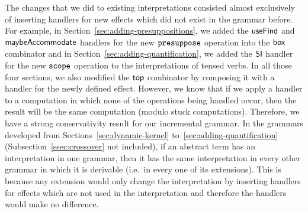 The changes that we did to existing interpretations consisted almost
exclusively of inserting handlers for new effects which did not exist in
the grammar before. For example, in
Section~\ref{sec:adding-presuppositions}, we added the $\textsf{useFind}$ and
$\textsf{maybeAccommodate}$ handlers for the new $\mathtt{presuppose}$ operation into
the $\textsf{box}$ combinator and in Section~\ref{sec:adding-quantification}, we
added the $\textsf{SI}$ handler for the new $\mathtt{scope}$ operation to the
interpretations of tensed verbs. In all those four sections, we also
modified the $\textsf{top}$ combinator by composing it with a handler for the newly
defined effect. However, we know that if we apply a handler to a
computation in which none of the operations being handled occur, then the
result will be the same computation (modulo stuck computations). Therefore,
we have a strong conservativity result for our incremental grammar. In the
grammars developed from Sections~\ref{sec:dynamic-kernel}
to~\ref{sec:adding-quantification} (Subsection~\ref{ssec:crossover} not
included), if an abstract term has an interpretation in one grammar, then
it has the same interpretation in every other grammar in which it is
derivable (i.e.\ in every one of its extensions). This is because any
extension would only change the interpretation by inserting handlers for
effects which are not used in the interpretation and therefore the handlers
would make no difference.
